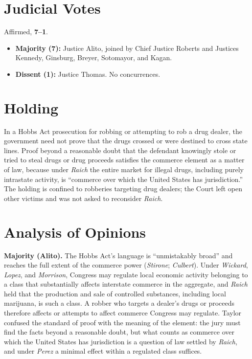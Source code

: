 \documentclass[12pt]{article}
\begin{document}
\section{Judicial Votes}

Affirmed, \textbf{7--1}.
\begin{itemize}
\item \textbf{Majority (7):} Justice Alito, joined by Chief Justice Roberts and Justices Kennedy, Ginsburg, Breyer, Sotomayor, and Kagan.
\item \textbf{Dissent (1):} Justice Thomas. No concurrences.
\end{itemize}

\section{Holding}

In a Hobbs Act prosecution for robbing or attempting to rob a drug dealer, the government need not prove that the drugs crossed or were destined to cross state lines. Proof beyond a reasonable doubt that the defendant knowingly stole or tried to steal drugs or drug proceeds satisfies the commerce element as a matter of law, because under \textit{Raich} the entire market for illegal drugs, including purely intrastate activity, is ``commerce over which the United States has jurisdiction.'' The holding is confined to robberies targeting drug dealers; the Court left open other victims and was not asked to reconsider \textit{Raich}.

\section{Analysis of Opinions}

\textbf{Majority (Alito).} The Hobbs Act's language is ``unmistakably broad'' and reaches the full extent of the commerce power (\textit{Stirone}; \textit{Culbert}). Under \textit{Wickard}, \textit{Lopez}, and \textit{Morrison}, Congress may regulate local economic activity belonging to a class that substantially affects interstate commerce in the aggregate, and \textit{Raich} held that the production and sale of controlled substances, including local marijuana, is such a class. A robber who targets a dealer's drugs or proceeds therefore affects or attempts to affect commerce Congress may regulate. Taylor confused the standard of proof with the meaning of the element: the jury must find the facts beyond a reasonable doubt, but what counts as commerce over which the United States has jurisdiction is a question of law settled by \textit{Raich}, and under \textit{Perez} a minimal effect within a regulated class suffices.
\end{document}
